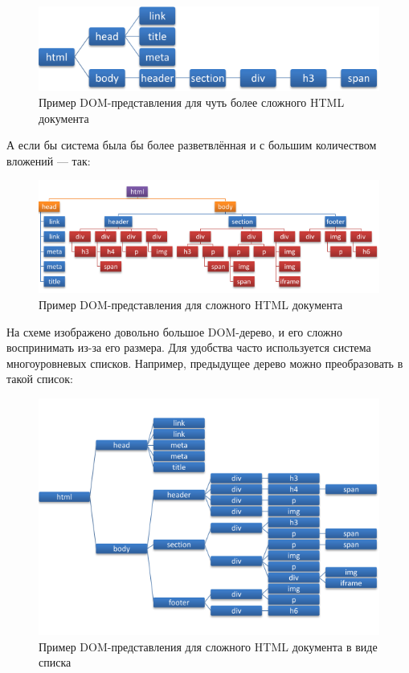 \begin{figure}[h]
	\centering
	\includegraphics[width=\textwidth]{img/simple-dom-2.png}
	\caption{Пример DOM-представления для чуть более сложного HTML документа}
	\label{fig:simple-dom-2}
\end{figure}

\clearpage

А если бы система была бы более разветвлённая и с большим количеством вложений --- так:

\begin{figure}[h]
	\centering
	\includegraphics[width=150mm]{img/complicated-dom.png}
	\caption{Пример DOM-представления для сложного HTML документа}
	\label{fig:complicated-dom}
\end{figure}

На схеме изображено довольно большое DOM-дерево, и его сложно воспринимать из-за его размера.
Для удобства часто используется система многоуровневых списков. 
Например, предыдущее дерево можно преобразовать в такой список:

\begin{figure}[h]
	\centering
	\includegraphics[width=150mm]{img/complicated-dom-list.png}
	\caption{Пример DOM-представления для сложного HTML документа в виде списка}
	\label{fig:complicated-dom-list}
\end{figure}

